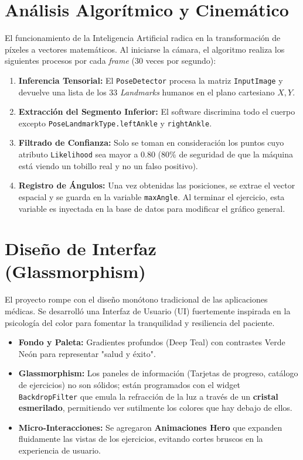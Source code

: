 \documentclass[12pt, a4paper]{article}
\begin{document}
\section{Análisis Algorítmico y Cinemático}
El funcionamiento de la Inteligencia Artificial radica en la transformación de píxeles a vectores matemáticos. Al iniciarse la cámara, el algoritmo realiza los siguientes procesos por cada \textit{frame} (30 veces por segundo):

\begin{enumerate}
    \item \textbf{Inferencia Tensorial:} El \texttt{PoseDetector} procesa la matriz \texttt{InputImage} y devuelve una lista de los 33 \textit{Landmarks} humanos en el plano cartesiano $X, Y$.
    \item \textbf{Extracción del Segmento Inferior:} El software discrimina todo el cuerpo excepto \texttt{PoseLandmarkType.leftAnkle} y \texttt{rightAnkle}.
    \item \textbf{Filtrado de Confianza:} Solo se toman en consideración los puntos cuyo atributo \texttt{Likelihood} sea mayor a $0.80$ (80\% de seguridad de que la máquina está viendo un tobillo real y no un falso positivo).
    \item \textbf{Registro de Ángulos:} Una vez obtenidas las posiciones, se extrae el vector espacial y se guarda en la variable \texttt{maxAngle}. Al terminar el ejercicio, esta variable es inyectada en la base de datos para modificar el gráfico general.
\end{enumerate}

\section{Diseño de Interfaz (Glassmorphism)}
El proyecto rompe con el diseño monótono tradicional de las aplicaciones médicas. Se desarrolló una Interfaz de Usuario (UI) fuertemente inspirada en la psicología del color para fomentar la tranquilidad y resiliencia del paciente.
\begin{itemize}
    \item \textbf{Fondo y Paleta:} Gradientes profundos (Deep Teal) con contrastes Verde Neón para representar "salud y éxito".
    \item \textbf{Glassmorphism:} Los paneles de información (Tarjetas de progreso, catálogo de ejercicios) no son sólidos; están programados con el widget \texttt{BackdropFilter} que emula la refracción de la luz a través de un \textbf{cristal esmerilado}, permitiendo ver sutilmente los colores que hay debajo de ellos.
    \item \textbf{Micro-Interacciones:} Se agregaron \textbf{Animaciones Hero} que expanden fluidamente las vistas de los ejercicios, evitando cortes bruscos en la experiencia de usuario.
\end{itemize}
\end{document}
